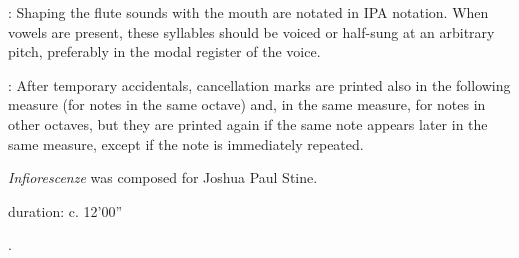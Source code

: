 \documentclass[11pt]{article}
\begin{document}
\begin{multicols}{2}
\vspace*{0.25cm}


 : Shaping the flute sounds with the mouth are notated in IPA notation. When vowels are present, these syllables should be voiced or half-sung at an arbitrary pitch, preferably in the modal register of the voice. \\
\rightskip\leftskip
\phantom{text} \hfill \phantom{()}

\vspace*{0.25cm}


 : After temporary accidentals, cancellation marks are printed also in the following measure (for notes in the same octave) and, in the same measure, for notes in other octaves, but they are printed again if the same note appears later in the same measure, except if the note is immediately repeated. \\
\rightskip\leftskip
\phantom{text} \hfill \phantom{()}

\end{multicols}

\vspace*{20\baselineskip}

\begin{center}
\textit{Infiorescenze} was composed for Joshua Paul Stine.
\end{center}

\vspace*{15\baselineskip}

\begin{center}
duration: c. 12'00''
\end{center}

.
\end{document}
